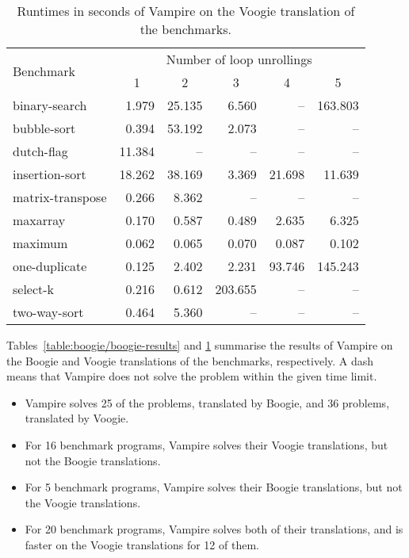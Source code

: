 \begin{table}\center
  \caption{Runtimes in seconds of Vampire on the Voogie translation of the benchmarks.}
  \label{table:boogie/voogie-results}
  \begin{tabular}[t]{lrrrrr}
\hline
\multirow{2}{*}{Benchmark} & \multicolumn{5}{c}{Number of loop unrollings} \\ %
& \multicolumn{1}{c}{1} & \multicolumn{1}{c}{2} & \multicolumn{1}{c}{3} & \multicolumn{1}{c}{4} & \multicolumn{1}{c}{5} \\
\hline
binary-search    &  1.979 & 25.135 &   6.560 &     -- & 163.803 \\
bubble-sort      &  0.394 & 53.192 &   2.073 &     -- &      -- \\
dutch-flag       & 11.384 &     -- &      -- &     -- &      -- \\
insertion-sort   & 18.262 & 38.169 &   3.369 & 21.698 &  11.639 \\
matrix-transpose &  0.266 &  8.362 &      -- &     -- &      -- \\
maxarray         &  0.170 &  0.587 &   0.489 &  2.635 &   6.325 \\
maximum          &  0.062 &  0.065 &   0.070 &  0.087 &   0.102 \\
one-duplicate    &  0.125 &  2.402 &   2.231 & 93.746 & 145.243 \\
select-k         &  0.216 &  0.612 & 203.655 &     -- &      -- \\
two-way-sort     &  0.464 &  5.360 &      -- &     -- &      -- \\
  \end{tabular}
\end{table}

Tables~\ref{table:boogie/boogie-results} and \ref{table:boogie/voogie-results} summarise the results of Vampire on the Boogie and Voogie translations of the benchmarks, respectively. A dash means that Vampire does not solve the problem within the given time limit.
\begin{itemize}
  \item Vampire solves 25 of the problems, translated by Boogie, and 36 problems, translated by Voogie.
  \item For 16 benchmark programs, Vampire solves their Voogie translations, but not the Boogie translations.
  \item For 5 benchmark programs, Vampire solves their Boogie translations, but not the Voogie translations.
  \item For 20 benchmark programs, Vampire solves both of their translations, and is faster on the Voogie translations for 12 of them.
\end{itemize}

